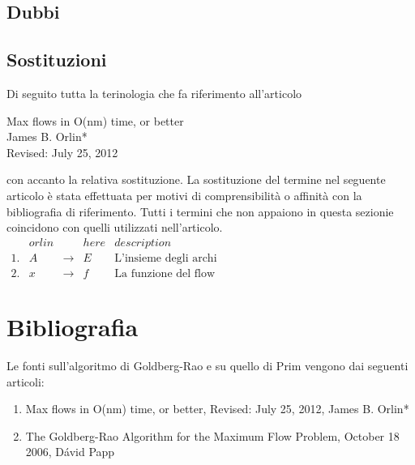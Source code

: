 \documentclass[a4paper, 11pt]{report}
\begin{document}
\newpage
\section{Dubbi}
    
\section{Sostituzioni}
Di seguito tutta la terinologia che fa riferimento all'articolo
\begin{center}
    Max flows in O(nm) time, or better\\
    James B. Orlin*\\
    Revised: July 25, 2012\\
\end{center}
con accanto la relativa sostituzione. La sostituzione del termine nel seguente articolo è stata effettuata per 
motivi di comprensibilità o affinità con la bibliografia di riferimento. Tutti i termini che non appaiono in questa
 sezionie coincidono con quelli utilizzati nell'articolo.\\
$\begin{array}{lcccl}
      &orlin&          &here& description\\\hline
    1.& A & \rightarrow &E& \text{L'insieme degli archi}\\
    2.& x & \rightarrow &f& \text{La funzione del flow}
\end{array}$

\chapter*{Bibliografia}
    Le fonti sull'algoritmo di Goldberg-Rao e su quello di Prim vengono dai seguenti articoli:
   \begin{enumerate}
    \item  Max flows in O(nm) time, or better, Revised: July 25, 2012, James B. Orlin*
    \item The Goldberg-Rao Algorithm for the Maximum Flow Problem, October 18 2006, Dávid Papp
   \end{enumerate}
\end{document}
